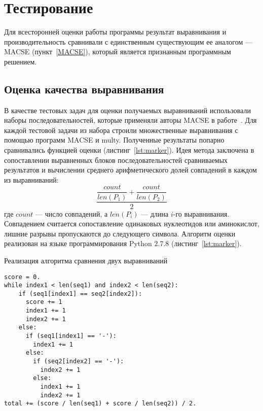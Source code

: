 \clearpage
\newpage

\section[Тестирование]{\large \centering Тестирование}
\hspace{\parindent} Для всесторонней оценки работы программы результат выравнивания и производительность сравнивали с единственным существующим ее аналогом --- MACSE (пункт~\ref{MACSE}), который является признанным программным решением. 

\subsection[Оценка качества выравнивания]{\large Оценка качества выравнивания}
\hspace{\parindent} В качестве тестовых задач для оценки получаемых выравниваний использовали наборы последовательностей, которые применяли авторы MACSE в работе~\cite{MACSE}. Для каждой тестовой задачи из набора строили множественные выравнивания с помощью программ MACSE и multy. Полученные результаты попарно сравнивались функцией оценки (листинг~\ref{lst:marker}). Идея метода заключена в сопоставлении выравненных блоков последовательностей сравниваемых результатов и вычислении среднего арифметического долей совпадений в каждом из выравниваний:
\begin{equation*}
\dfrac{\dfrac{count}{len(P_1)} + \dfrac{count}{len(P_2)}}{2}
\end{equation*}
где $count$ --- число совпадений, а $len(P_i)$ --- длина $i$-го выравнивания. Совпадением считается сопоставление одинаковых нуклеотидов или аминокислот, лишние разрывы пропускаются до следующего символа. Алгоритм оценки реализован на языке программирования Python 2.7.8 (листинг~\ref{lst:marker}).
\begin{algorithm}
	\caption{Реализация алгоритма сравнения двух выравниваний} \label{lst:marker}
	\begin{lstlisting}
score = 0.
while index1 < len(seq1) and index2 < len(seq2):
    if (seq1[index1] == seq2[index2]):
      score += 1
      index1 += 1
      index2 += 1
    else:
      if (seq1[index1] == '-'):
        index1 += 1
      else:
        if (seq2[index2] == '-'):
          index2 += 1
        else:
          index1 += 1
          index2 += 1
total += (score / len(seq1) + score / len(seq2)) / 2.
	\end{lstlisting}
\end{algorithm}
